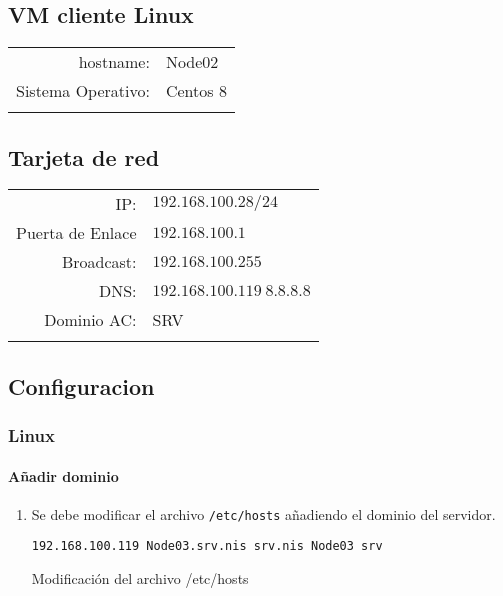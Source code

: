 \documentclass[../main.tex]{subfiles}
\begin{document}
\subsection{VM cliente Linux}\label{sec:cliente_vmlinux}
\begin{table}[htbp]
  \centering
  \begin{tabular}{rl}
    \hline{}
    hostname:&Node02\\
    Sistema Operativo:&Centos 8\\
    \hline{}
  \end{tabular}
\end{table}

\subsection{Tarjeta de red}\label{sec:ctr}
\begin{table}[htbp]
  \centering
  \begin{tabular}{rl}
    \hline{}
    IP:&$192.168.100.28/24$\\
    Puerta de Enlace&$192.168.100.1$\\
    Broadcast:&$192.168.100.255$\\
    DNS:&$192.168.100.119\ 8.8.8.8$\\
    Dominio AC:&SRV\\
    \hline{}
  \end{tabular}
\end{table}


\subsection{Configuracion}\label{sec:cliente_conf}

\subsubsection{Linux}\label{sec:cliente_linux}

\paragraph{Añadir dominio}
\begin{enumerate}
  \item Se debe modificar el archivo \texttt{/etc/hosts} añadiendo
        el dominio del servidor.
        \begin{listing}[H]
\begin{verbatim}
192.168.100.119 Node03.srv.nis srv.nis Node03 srv
\end{verbatim}
          \label{list:hosts}
          \caption{Modificación del archivo /etc/hosts}
        \end{listing}
\end{enumerate}
\end{document}
